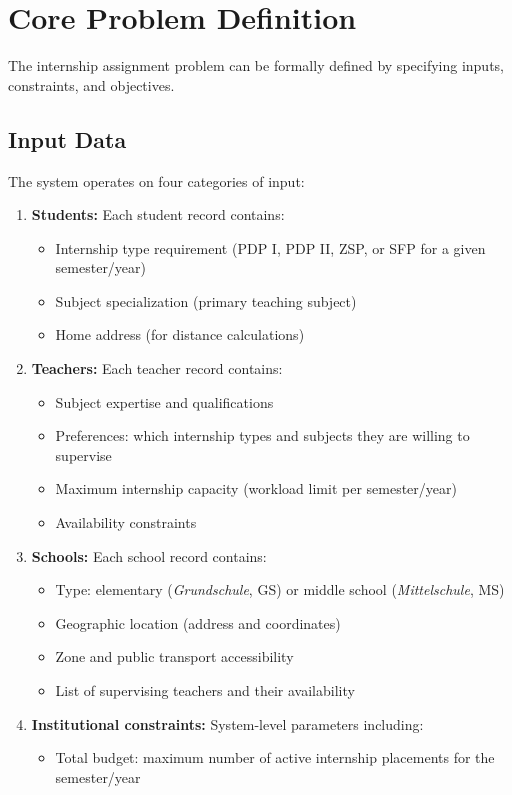 \documentclass[12pt,a4paper]{report}
\begin{document}
\section{Core Problem Definition}

The internship assignment problem can be formally defined by specifying inputs, constraints, and objectives.

\subsection{Input Data}

The system operates on four categories of input:

\begin{enumerate}
    \item \textbf{Students:} Each student record contains:
    \begin{itemize}
        \item Internship type requirement (PDP I, PDP II, ZSP, or SFP for a given semester/year)
        \item Subject specialization (primary teaching subject)
        \item Home address (for distance calculations)
    \end{itemize}
    
    \item \textbf{Teachers:} Each teacher record contains:
    \begin{itemize}
        \item Subject expertise and qualifications
        \item Preferences: which internship types and subjects they are willing to supervise
        \item Maximum internship capacity (workload limit per semester/year)
        \item Availability constraints
    \end{itemize}
    
    \item \textbf{Schools:} Each school record contains:
    \begin{itemize}
        \item Type: elementary (\textit{Grundschule}, GS) or middle school (\textit{Mittelschule}, MS)
        \item Geographic location (address and coordinates)
        \item Zone and public transport accessibility
        \item List of supervising teachers and their availability
    \end{itemize}
    
    \item \textbf{Institutional constraints:} System-level parameters including:
    \begin{itemize}
        \item Total budget: maximum number of active internship placements for the semester/year
    \end{itemize}
\end{enumerate}
\end{document}
